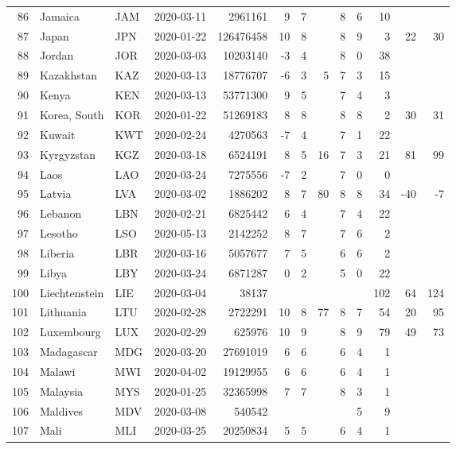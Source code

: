 \begin{longtable}{rlllrrrrrrrrr}
  86 & Jamaica & JAM & 2020-03-11 & 2961161 & 9 & 7 &  & 8 & 6 & 10 &  &  \\ 
  87 & Japan & JPN & 2020-01-22 & 126476458 & 10 & 8 &  & 8 & 9 & 3 & 22 & 30 \\ 
  88 & Jordan & JOR & 2020-03-03 & 10203140 & -3 & 4 &  & 8 & 0 & 38 &  &  \\ 
  89 & Kazakhstan & KAZ & 2020-03-13 & 18776707 & -6 & 3 & 5 & 7 & 3 & 15 &  &  \\ 
  90 & Kenya & KEN & 2020-03-13 & 53771300 & 9 & 5 &  & 7 & 4 & 3 &  &  \\ 
  91 & Korea, South & KOR & 2020-01-22 & 51269183 & 8 & 8 &  & 8 & 8 & 2 & 30 & 31 \\ 
  92 & Kuwait & KWT & 2020-02-24 & 4270563 & -7 & 4 &  & 7 & 1 & 22 &  &  \\ 
  93 & Kyrgyzstan & KGZ & 2020-03-18 & 6524191 & 8 & 5 & 16 & 7 & 3 & 21 & 81 & 99 \\ 
  94 & Laos & LAO & 2020-03-24 & 7275556 & -7 & 2 &  & 7 & 0 & 0 &  &  \\ 
  95 & Latvia & LVA & 2020-03-02 & 1886202 & 8 & 7 & 80 & 8 & 8 & 34 & -40 & -7 \\ 
  96 & Lebanon & LBN & 2020-02-21 & 6825442 & 6 & 4 &  & 7 & 4 & 22 &  &  \\ 
  97 & Lesotho & LSO & 2020-05-13 & 2142252 & 8 & 7 &  & 7 & 6 & 2 &  &  \\ 
  98 & Liberia & LBR & 2020-03-16 & 5057677 & 7 & 5 &  & 6 & 6 & 2 &  &  \\ 
  99 & Libya & LBY & 2020-03-24 & 6871287 & 0 & 2 &  & 5 & 0 & 22 &  &  \\ 
  100 & Liechtenstein & LIE & 2020-03-04 & 38137 &  &  &  &  &  & 102 & 64 & 124 \\ 
  101 & Lithuania & LTU & 2020-02-28 & 2722291 & 10 & 8 & 77 & 8 & 7 & 54 & 20 & 95 \\ 
  102 & Luxembourg & LUX & 2020-02-29 & 625976 & 10 & 9 &  & 8 & 9 & 79 & 49 & 73 \\ 
  103 & Madagascar & MDG & 2020-03-20 & 27691019 & 6 & 6 &  & 6 & 4 & 1 &  &  \\ 
  104 & Malawi & MWI & 2020-04-02 & 19129955 & 6 & 6 &  & 6 & 4 & 1 &  &  \\ 
  105 & Malaysia & MYS & 2020-01-25 & 32365998 & 7 & 7 &  & 8 & 3 & 1 &  &  \\ 
  106 & Maldives & MDV & 2020-03-08 & 540542 &  &  &  &  & 5 & 9 &  &  \\ 
  107 & Mali & MLI & 2020-03-25 & 20250834 & 5 & 5 &  & 6 & 4 & 1 &  &  \\ 

\end{longtable}
